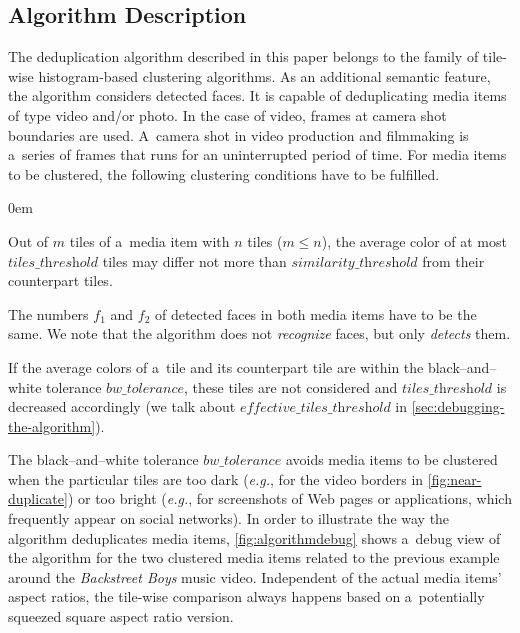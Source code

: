 \documentclass{article}
\begin{document}
\subsection{Algorithm Description}
The deduplication algorithm described in this paper belongs to the family of tile-wise histogram-based clustering algorithms. As an additional semantic feature, the algorithm considers detected faces. It is capable of deduplicating media items of type video and/or photo. In the case of video, frames at camera shot boundaries are used. A~camera shot in video production and filmmaking is a~series of frames that runs for an uninterrupted period of time. For media items to be clustered, the following clustering conditions have to be fulfilled.
\begin{description}
  \itemsep0em
  \item[Cond.~1] Out of $m$ tiles of a~media item with $n$ tiles ($m \leq n$), the average color of at most $\textit{tiles\_threshold}$ tiles may differ not more than $\textit{similarity\_threshold}$ from their counterpart tiles.
  \item[Cond.~2] The numbers $f_1$ and $f_2$ of detected faces in both media items have to be the same. We note that the algorithm does not \emph{recognize} faces, but only \emph{detects} them.
  \item[Cond.~3] If the average colors of a~tile and its counterpart tile are within the black--and--white tolerance $\textit{bw\_tolerance}$, these tiles are not considered and $\textit{tiles\_threshold}$ is decreased accordingly (we talk about $\textit{effective\_tiles\_threshold}$ in \autoref{sec:debugging-the-algorithm}).
\end{description}

The black--and--white tolerance $\textit{bw\_tolerance}$ avoids media items to be clustered when the particular tiles are too dark (\emph{e.g.}, for the video borders in \autoref{fig:near-duplicate}) or too bright (\emph{e.g.}, for screenshots of Web pages or applications, which frequently appear on social networks). In order to illustrate the way the algorithm deduplicates media items, \autoref{fig:algorithmdebug} shows a~debug view of the algorithm for the two clustered media items related to the previous example around the \emph{Backstreet Boys} music video. Independent of the actual media items' aspect ratios, the tile-wise comparison always happens based on a~potentially squeezed square aspect ratio version.
\end{document}
